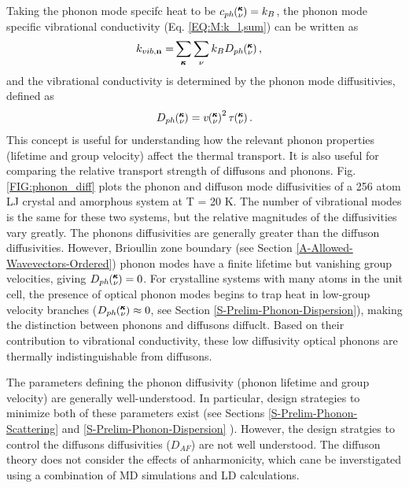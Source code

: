 \documentclass[letterpaper,12pt]{article}
\newcommand{\kv}{\mspace{-4.0mu}\left(\mspace{-8.0mu}\begin{smallmatrix}&\pmb{\kappa} \\&\nu\end{smallmatrix}\mspace{-3.0mu}\right)}
\begin{document}
Taking the phonon mode specifc heat to be $c_{ph} \kv = k_{B}$, the phonon mode specific vibrational conductivity (Eq$.$ \eqref{EQ:M:k_l,sum}) can be written as
\begin{equation}\label{EQ:k_sum}
\begin{split}
k_{vib,\mathbf{n}}=&\sum_{\pmb{\kappa}} \sum_\nu k_{B} D_{ph}\kv,
\end{split}
\end{equation}
and the vibrational conductivity is determined by the phonon mode diffusitivies, defined as
\begin{equation}\label{EQ:k_sum}
\begin{split}
D_{ph}\kv =  v\kv^{2} \tau\kv.
\end{split}
\end{equation}
This concept is useful for understanding how the relevant phonon properties (lifetime and group velocity) affect the thermal transport. It is also useful for comparing the relative transport strength of diffusons and phonons. Fig. \ref{FIG:phonon_diff} plots the phonon and diffuson mode diffusivities of a 256 atom LJ crystal and amorphous system at T = 20 K. The number of vibrational modes is the same for these two systems, but the relative magnitudes of the diffusivities vary greatly. The phonons diffusivities are generally greater than the diffuson diffusivities.  However, Brioullin zone boundary (see Section \ref{A-Allowed-Wavevectors-Ordered}) phonon modes have a finite lifetime but vanishing group velocities, giving $D_{ph}\kv =  0$.\cite{dove1993} For crystalline systems with many atoms in the unit cell, the presence of optical phonon modes begins to trap heat in low-group velocity branches ($D_{ph}\kv \approx  0$, see Section \ref{S-Prelim-Phonon-Dispersion}), making the distinction between phonons and diffusons diffuclt. Based on their contribution to vibrational conductivity, these low diffusivity optical phonons are thermally indistinguishable from diffusons.

The parameters defining the phonon diffusivity (phonon lifetime and group velocity) are generally well-understood. In particular, design strategies to minimize both of these parameters exist (see Sections \ref{S-Prelim-Phonon-Scattering} and \ref{S-Prelim-Phonon-Dispersion} ). However, the design stratgies to control the diffusons diffusivities ($D_{AF}$) are not well understood.\cite{allen1993,shenogin2009} The diffuson theory does not consider the effects of anharmonicity, which cane be inverstigated using a combination of MD simulations and LD calculations.\cite{shenogin2009}
\end{document}
